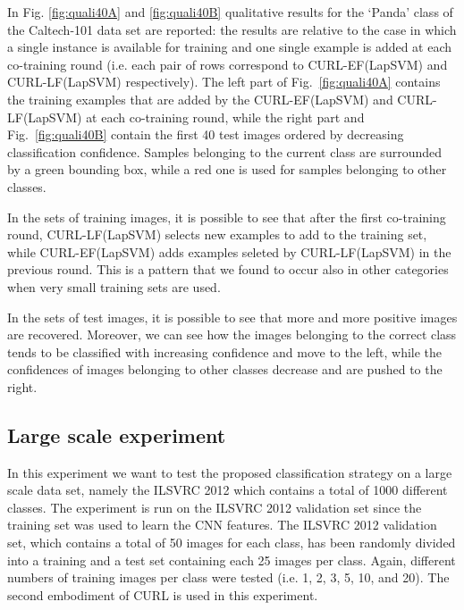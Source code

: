 \documentclass[journal,11pt]{IEEEtran}
\newcommand{\coso}{strategy}
\newcommand{\emb}{embodiment}
\newcommand{\curllaplf}{CURL-LF(LapSVM)}
\newcommand{\curllapef}{CURL-EF(LapSVM)}
\begin{document}
In Fig. \ref{fig:quali40A} and \ref{fig:quali40B} %
qualitative results for the `Panda' class of the Caltech-101 data set are reported: the results are relative to the case in which a single instance is available for training and one single example is added at each co-training round (i.e. each pair of rows correspond to \curllapef{ }and \curllaplf{ }respectively). The left part of Fig.~\ref{fig:quali40A} contains the training examples that are added by the \curllapef{ }and \curllaplf{ }at each co-training round, while the right part and Fig.~\ref{fig:quali40B} contain the first 40 test images ordered by decreasing classification confidence. Samples belonging to the current class are surrounded by a green bounding box, while a red one is used for samples belonging to other classes.

In the sets of training images, it is possible to see that after the first co-training round, \curllaplf{ }selects new examples to add to the training set, while \curllapef{ }adds examples seleted by \curllaplf{ }in the previous round. This is a pattern that we found to occur also in other categories when very small training sets are used.

In the sets of test images, it is possible to see that more and more positive images are recovered. Moreover, we can see how the images belonging to the correct class tends to be classified with increasing confidence and move to the left, while the confidences of images belonging to other classes decrease and are pushed to the right.



\subsection{Large scale experiment}
\label{subsec:ilvsrc}

In this experiment we want to test the proposed classification \coso{ }on a large scale data set, namely the ILSVRC 2012 which contains a total of 1000 different classes. The experiment is run on the ILSVRC 2012 validation set since the training set was used to learn the CNN features. The ILSVRC 2012 validation set, which contains a total of 50 images for each class, has been randomly divided into a training and a test set containing each 25 images per class. Again, different numbers of training images per class were tested (i.e. 1, 2, 3, 5, 10, and 20). The second \emb{ } of CURL is used in this experiment.
\end{document}
